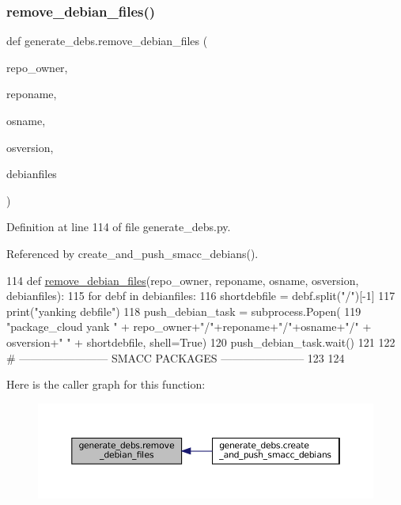 \subsubsection{\texorpdfstring{remove\+\_\+debian\+\_\+files()}{remove\_debian\_files()}}
{\footnotesize\ttfamily def generate\+\_\+debs.\+remove\+\_\+debian\+\_\+files (\begin{DoxyParamCaption}\item[{}]{repo\+\_\+owner,  }\item[{}]{reponame,  }\item[{}]{osname,  }\item[{}]{osversion,  }\item[{}]{debianfiles }\end{DoxyParamCaption})}



Definition at line 114 of file generate\+\_\+debs.\+py.



Referenced by create\+\_\+and\+\_\+push\+\_\+smacc\+\_\+debians().


\begin{DoxyCode}
114 \textcolor{keyword}{def }\hyperlink{namespacegenerate__debs_a08095040d038b3613ad0e77fd4e7f60e}{remove\_debian\_files}(repo\_owner, reponame,  osname, osversion, debianfiles):
115     \textcolor{keywordflow}{for} debf \textcolor{keywordflow}{in} debianfiles:
116         shortdebfile = debf.split(\textcolor{stringliteral}{"/"})[-1]
117         print(\textcolor{stringliteral}{"yanking debfile"})
118         push\_debian\_task = subprocess.Popen(
119             \textcolor{stringliteral}{"package\_cloud yank "} + repo\_owner+\textcolor{stringliteral}{"/"}+reponame+\textcolor{stringliteral}{"/"}+osname+\textcolor{stringliteral}{"/"} + osversion+\textcolor{stringliteral}{" "} + shortdebfile, 
      shell=\textcolor{keyword}{True})
120         push\_debian\_task.wait()
121 
122 \textcolor{comment}{# ------------------------ SMACC PACKAGES -----------------------}
123 
124 
\end{DoxyCode}
Here is the caller graph for this function\+:
\nopagebreak
\begin{figure}[H]
\begin{center}
\leavevmode
\includegraphics[width=350pt]{namespacegenerate__debs_a08095040d038b3613ad0e77fd4e7f60e_icgraph}
\end{center}
\end{figure}



